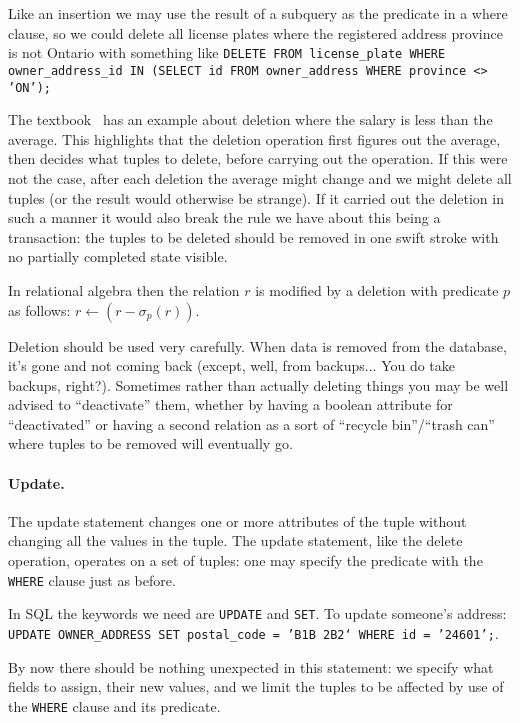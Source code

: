 \documentclass[a4paper]{report}
\begin{document}
Like an insertion we may use the result of a subquery as the predicate in a where clause, so we could delete all license plates where the registered address province is not Ontario with something like \texttt{DELETE FROM license\_plate WHERE owner\_address\_id IN (SELECT id FROM owner\_address WHERE province <> 'ON');}

The textbook~\cite{dsc} has an example about deletion where the salary is less than the average. This highlights that the deletion operation first figures out the average, then decides what tuples to delete, before carrying out the operation. If this were not the case, after each deletion the average might change and we might delete all tuples (or the result would otherwise be strange). If it carried out the deletion in such a manner it would also break the rule we have about this being a transaction: the tuples to be deleted should be removed in one swift stroke with no partially completed state visible.

In relational algebra then the relation $r$ is modified by a deletion with predicate $p$ as follows: $r \leftarrow (r - \sigma_{p}( r ) )$.

Deletion should be used very carefully. When data is removed from the database, it's gone and not coming back (except, well, from backups... You do take backups, right?). Sometimes rather than actually deleting things you may be well advised to ``deactivate'' them, whether by having a boolean attribute for ``deactivated'' or having a second relation as a sort of ``recycle bin''/``trash can'' where tuples to be removed will eventually go.

\paragraph{Update.} 
The update statement changes one or more attributes of the tuple without changing all the values in the tuple. The update statement, like the delete operation, operates on a set of tuples: one may specify the predicate with the \texttt{WHERE} clause just as before. 

In SQL the keywords we need are \texttt{UPDATE} and \texttt{SET}.  To update someone's address: \texttt{UPDATE OWNER\_ADDRESS SET postal\_code = 'B1B 2B2` WHERE id = '24601';}. 

By now there should be nothing unexpected in this statement: we specify what fields to assign, their new values, and we limit the tuples to be affected by use of the \texttt{WHERE} clause and its predicate. 
\end{document}
